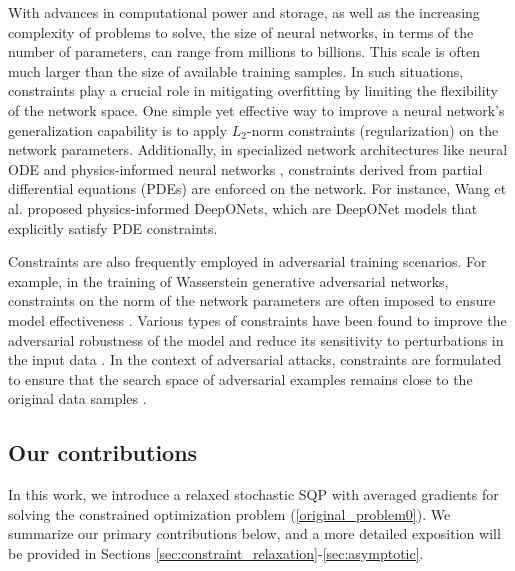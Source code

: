 \documentclass[aos]{imsart}
\numberwithin{equation}{section}
\theoremstyle{plain}
\begin{document}
With advances in computational power and storage, as well as the increasing complexity of problems to solve, the size of neural networks, in terms of the number of parameters, can range from millions to billions. This scale is often much larger than the size of available training samples. In such situations, constraints play a crucial role in mitigating overfitting by limiting the flexibility of the network space.
One simple yet effective way to improve a neural network's generalization capability is to apply $L_2$-norm constraints (regularization) on the network parameters. Additionally, in specialized network architectures like neural ODE \cite{chen2018neural} and physics-informed neural networks \cite{raissi2019physics, karniadakis2021physics}, constraints derived from partial differential equations (PDEs) are enforced on the network. For instance, Wang et al. \cite{wang2021learning} proposed physics-informed DeepONets, which are DeepONet models that explicitly satisfy PDE constraints. 


Constraints are also frequently employed in adversarial training scenarios. For example, in the training of Wasserstein generative adversarial networks, constraints on the norm of the network parameters are often imposed to ensure model effectiveness \cite{arjovsky2017wasserstein}. Various types of constraints have been found to improve the adversarial robustness of the model and reduce its sensitivity to perturbations in the input data \cite{cisse2017parseval}. In the context of adversarial attacks, constraints are formulated to ensure that the search space of adversarial examples remains close to the original data samples \cite{goodfellow2014explaining, su2019one, zhu2023adversarial}.




\subsection{Our contributions}
In this work, we introduce a relaxed stochastic SQP with averaged gradients for solving the constrained optimization problem (\ref{original_problem0}). We summarize our primary contributions below, and a more detailed exposition will be provided in Sections \ref{sec:constraint_relaxation}-\ref{sec:asymptotic}.
\end{document}
